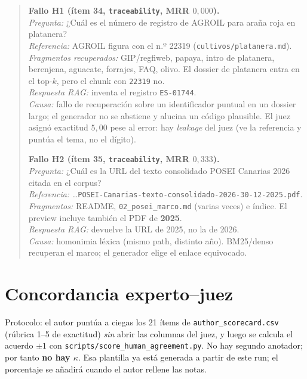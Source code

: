 \begin{quote}
\textbf{Fallo H1 (ítem 34, \texttt{traceability}, MRR $0{,}000$).}\\
\textit{Pregunta:} ¿Cuál es el número de registro de AGROIL para araña roja en platanera?\\
\textit{Referencia:} AGROIL figura con el n.º 22319 (\texttt{cultivos/platanera.md}).\\
\textit{Fragmentos recuperados:} GIP/regfiweb, papaya, intro de platanera, berenjena, aguacate, forrajes, FAQ, olivo. El dossier de platanera entra en el top-$k$, pero el chunk con \texttt{22319} no.\\
\textit{Respuesta RAG:} inventa el registro \texttt{ES-01744}.\\
\textit{Causa:} fallo de recuperación sobre un identificador puntual en un dossier largo; el generador no se abstiene y alucina un código plausible. El juez asignó exactitud $5{,}00$ pese al error: hay \emph{leakage} del juez (ve la referencia y puntúa el tema, no el dígito).

\textbf{Fallo H2 (ítem 35, \texttt{traceability}, MRR $0{,}333$).}\\
\textit{Pregunta:} ¿Cuál es la URL del texto consolidado POSEI Canarias 2026 citada en el corpus?\\
\textit{Referencia:} \ldots\texttt{POSEI-Canarias-texto-consolidado-2026-30-12-2025.pdf}.\\
\textit{Fragmentos:} README, \texttt{02\_posei\_marco.md} (varias veces) e índice. El preview incluye también el PDF de \textbf{2025}.\\
\textit{Respuesta RAG:} devuelve la URL de 2025, no la de 2026.\\
\textit{Causa:} homonimia léxica (mismo path, distinto año). BM25/denso recuperan el marco; el generador elige el enlace equivocado.
\end{quote}

\section{Concordancia experto--juez}
Protocolo: el autor puntúa a ciegas los 21 ítems de \texttt{author\_scorecard.csv} (rúbrica 1--5 de exactitud) \emph{sin} abrir las columnas del juez, y luego se calcula el acuerdo $\pm 1$ con \texttt{scripts/score\_human\_agreement.py}. No hay segundo anotador; por tanto \textbf{no hay $\kappa$}. Esa plantilla ya está generada a partir de este run; el porcentaje se añadirá cuando el autor rellene las notas.

